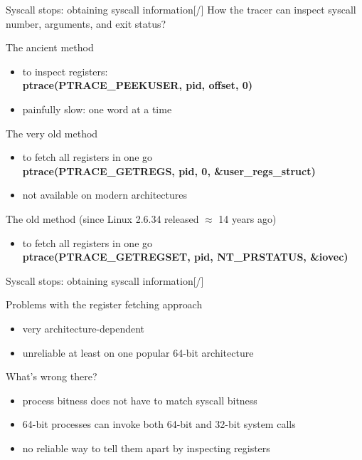 \documentclass[unicode,aspectratio=169,xcolor={table,dvipsnames,usernames}]{beamer}
\begin{document}
\begin{frame}{\Large Syscall stops: obtaining syscall information\hfill [\insertframenumber/\inserttotalframenumber]}
How the tracer can inspect syscall number, arguments, and exit status?

\begin{block}{The ancient method}
\begin{itemize}
	\item to inspect registers: \\
		\textbf{ptrace(PTRACE\_PEEKUSER, pid, offset, 0)}
	\item painfully slow: one word at a time
\end{itemize}
\end{block}

\begin{block}{The very old method}
\begin{itemize}
	\item to fetch all registers in one go \\
		\textbf{ptrace(PTRACE\_GETREGS, pid, 0, \&user\_regs\_struct)}
	\item not available on modern architectures
\end{itemize}
\end{block}

\begin{block}{The old method (since Linux 2.6.34 released $\approx$ 14 years ago)}
\begin{itemize}
	\item to fetch all registers in one go \\
		\textbf{ptrace(PTRACE\_GETREGSET, pid, NT\_PRSTATUS, \&iovec)}
\end{itemize}
\end{block}
\end{frame}

\begin{frame}{\Large Syscall stops: obtaining syscall information\hfill [\insertframenumber/\inserttotalframenumber]}
\Large
\begin{block}{Problems with the register fetching approach}
\begin{itemize}
	\item very architecture-dependent
	\item unreliable at least on one popular 64-bit architecture
\end{itemize}
\end{block}

\begin{block}{What's wrong there?}
\begin{itemize}
	\item process bitness does not have to match syscall bitness
	\item 64-bit processes can invoke both 64-bit and 32-bit system calls
	\item no reliable way to tell them apart by inspecting registers
\end{itemize}
\end{block}
\end{frame}
\end{document}
